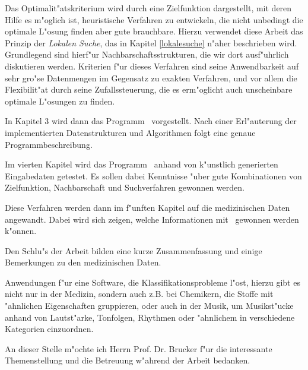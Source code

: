 Das Optimalit"atskriterium wird durch eine Zielfunktion dargestellt, 
mit deren Hilfe es m"oglich ist,
heuristische Verfahren zu entwickeln, die nicht unbedingt die optimale
L"osung finden aber gute brauchbare.
Hierzu verwendet diese Arbeit das Prinzip der {\em Lokalen Suche}, 
das in Kapitel \ref{lokalesuche} n"aher beschrieben wird.
Grundlegend sind hierf"ur Nachbarschaftsstrukturen, die wir dort
ausf"uhrlich diskutieren werden.
Kriterien f"ur dieses Verfahren sind 
seine Anwendbarkeit auf sehr gro"se Datenmengen im
Gegensatz zu exakten Verfahren, und
vor allem die Flexibilit"at durch seine
Zufallssteuerung, die es erm"oglicht auch unscheinbare optimale 
L"osungen zu finden.

In Kapitel 3 wird dann das Programm \Clustering\ vorgestellt.
Nach einer Erl"auterung der implementierten Datenstrukturen
und Algorithmen folgt eine genaue Programmbeschreibung.

Im vierten Kapitel wird das Programm \Clustering\ anhand von k"unstlich
generierten Eingabedaten getestet. Es sollen dabei Kenntnisse "uber
gute Kombinationen von Zielfunktion, Nachbarschaft und Suchverfahren
gewonnen werden.

Diese Verfahren werden dann im f"unften Kapitel auf die medizinischen
Daten angewandt. Dabei wird sich zeigen, welche Informationen mit
\Clustering\ gewonnen werden k"onnen.

Den Schlu"s der Arbeit bilden eine kurze Zusammenfassung und einige 
Bemerkungen zu den medizinischen Daten.

Anwendungen f"ur eine Software, die Klassifikationsprobleme l"ost,
hierzu gibt es nicht nur in der Medizin, sondern auch z.B. 
bei Chemikern, die Stoffe mit "ahnlichen Eigenschaften gruppieren, 
oder auch in der Musik, um Musikst"ucke anhand von Lautst"arke, 
Tonfolgen, Rhythmen oder "ahnlichem in  verschiedene Kategorien einzuordnen.


An dieser Stelle m"ochte ich Herrn Prof. Dr. Brucker
f"ur die interessante Themenstellung und die Betreuung w"ahrend
der Arbeit bedanken.
